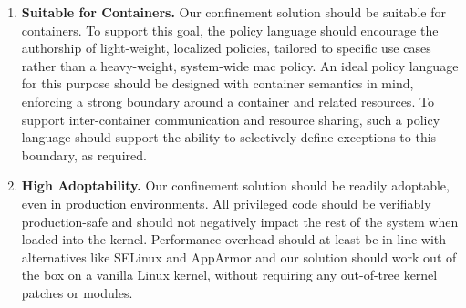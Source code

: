 \begin{enumerate}[font=\bfseries]
  \item \textbf{Suitable for Containers.}
    Our confinement solution should be suitable for containers. To support this goal, the
    policy language should encourage the authorship of light-weight, localized policies,
    tailored to specific use cases rather than a heavy-weight, system-wide \gls{mac}
    policy.  An ideal policy language for this purpose should be designed with container
    semantics in mind, enforcing a strong boundary around a container and related
    resources. To support inter-container communication and resource sharing, such
    a policy language should support the ability to selectively define exceptions to this
    boundary, as required.

  \item \textbf{High Adoptability.}
    Our confinement solution should be readily adoptable, even in production environments.
    All privileged code should be verifiably production-safe and should not negatively
    impact the rest of the system when loaded into the kernel. Performance overhead should
    at least be in line with alternatives like SELinux and AppArmor and our solution
    should work out of the box on a vanilla Linux kernel, without requiring any
    out-of-tree kernel patches or modules.

\end{enumerate}

